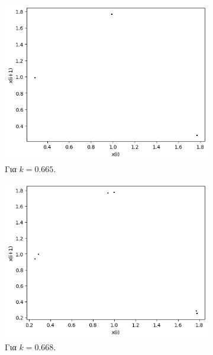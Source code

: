 \begin{figure}
\begin{subfigure}[b]{0.4\textwidth}
		\includegraphics[width=\textwidth]{LateX images/graphs q09/g9}
		\caption{Για $k=0.665$.}
		\label{f:k55}
	\end{subfigure}
	\hfill
	\begin{subfigure}[b]{0.4\textwidth}
		\centering
		\includegraphics[width=\textwidth]{LateX images/graphs q09/g10}
		\caption{Για $k=0.668$.}
		\label{f:k56}
	\end{subfigure}
	\hfill
	\begin{subfigure}[b]{0.4\textwidth}
		\centering

\end{subfigure}
\end{figure}
